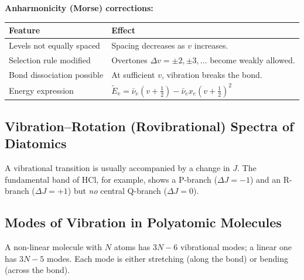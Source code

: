 \documentclass[12pt,a4paper]{article}
\begin{document}
\textbf{Anharmonicity (Morse) corrections:}\par\noindent
\begin{tabularx}{\linewidth}{|B{3.6cm}|Y|}
\hline
\textbf{Feature} & \textbf{Effect} \\
\hline
Levels not equally spaced & Spacing decreases as $v$ increases. \\
\hline
Selection rule modified & Overtones $\Delta v=\pm 2,\pm 3,\ldots$ become weakly allowed. \\
\hline
Bond dissociation possible & At sufficient $v$, vibration breaks the bond. \\
\hline
Energy expression & $\tilde{E}_v=\bar{\nu}_e(v+\tfrac12)-\bar{\nu}_e x_e (v+\tfrac12)^{2}$ \\
\hline
\end{tabularx}

\subsection{Vibration--Rotation (Rovibrational) Spectra of Diatomics}
A vibrational transition is usually accompanied by a change in $J$. The fundamental band of HCl, for example, shows a P-branch ($\Delta J=-1$) and an R-branch ($\Delta J=+1$) but \emph{no} central Q-branch ($\Delta J=0$).

\begin{tcolorbox}[tikzbox, title={Rovibrational Spectrum: P and R Branches}]
\centering
{}
\end{tcolorbox}

\subsection{Modes of Vibration in Polyatomic Molecules}
A non-linear molecule with $N$ atoms has $3N-6$ vibrational modes; a linear one has $3N-5$ modes. Each mode is either stretching (along the bond) or bending (across the bond).
\end{document}
